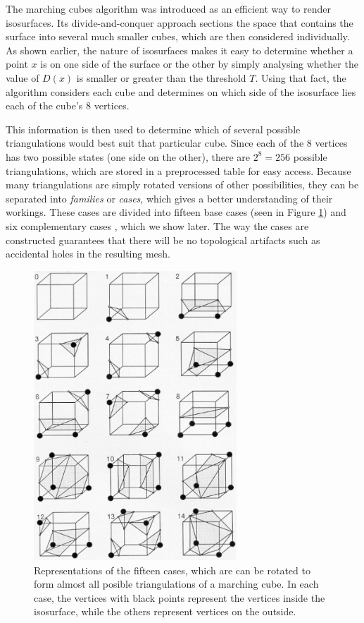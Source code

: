 \documentclass[conference]{acmsiggraph}
\begin{document}
The marching cubes algorithm \cite{Lorensen:1987:MCH:37402.37422} was introduced as an efficient way to render isosurfaces. Its divide-and-conquer approach sections the space that contains the surface into several much smaller cubes, which are then considered individually. As shown earlier, the nature of isosurfaces makes it easy to determine whether a point $x$ is on one side of the surface or the other by simply analysing whether the value of $D(x)$ is smaller or greater than the threshold $T$. Using that fact, the algorithm considers each cube and determines on which side of the isosurface lies each of the cube's 8 vertices.

This information is then used to determine which of several possible triangulations would best suit that particular cube. Since each of the 8 vertices has two possible states (one side on the other), there are $2^8 = 256$ possible triangulations, which are stored in a preprocessed table for easy access. Because many triangulations are simply rotated versions of other possibilities, they can be separated into \textit{families} or \textit{cases}, which gives a better understanding of their workings. These cases are divided into fifteen base cases (seen in Figure \ref{img:base-cases}) and six complementary cases \cite{Lingrand}, which we show later. The way the cases are constructed guarantees that there will be no topological artifacts such as accidental holes in the resulting mesh.

\begin{figure}[ht]
  \centering
  \includegraphics[width=3in]{images/base-cases}
  \caption{Representations of the fifteen cases, which are can be rotated to form almost all posible triangulations of a marching cube. In each case, the vertices with black points represent the vertices inside the isosurface, while the others represent vertices on the outside.}
  \label{img:base-cases}
\end{figure}
\end{document}
